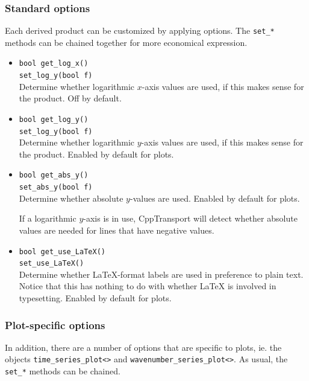\documentclass[11pt,a4paper]{article}
\newcommand{\packagefont}{\sffamily}
\newcommand{\CppTransport}{{\packagefont CppTransport}}
\begin{document}
\subsubsection{Standard options}
\label{sec:product-standard-options}
Each derived product can be customized by applying options.
The \texttt{set_*} methods can be chained together for more
economical expression.
\begin{itemize}
	\item \texttt{bool get_log_x()} \\
	\texttt{set_log_y(bool f)} \\
	Determine whether logarithmic $x$-axis values are used, if this makes sense
	for the product. Off by default.
	
	\item \texttt{bool get_log_y()} \\
	\texttt{set_log_y(bool f)} \\
	Determine whether logarithmic $y$-axis values are used, if this makes sense
	for the product. Enabled by default for plots.
	
	\item \texttt{bool get_abs_y()} \\
	\texttt{set_abs_y(bool f)} \\
	Determine whether absolute $y$-values are used. Enabled by default for plots.
	
	If a logarithmic $y$-axis is in use, {\CppTransport} will detect whether
	absolute values are needed for lines that have negative values.
	
	\item \texttt{bool get_use_LaTeX()} \\
	\texttt{set_use_LaTeX()} \\
	\label{method:use_LaTeX}
	Determine whether {\LaTeX}-format labels are used
	in preference to plain text.
	Notice that this has nothing to do with whether {\LaTeX}
	is involved in typesetting. Enabled by default for plots.
\end{itemize}

\subsubsection{Plot-specific options}
\label{sec:plot-options}
In addition, there are a number of options that are specific to plots,
ie. the objects
\texttt{time_series_plot<>}
and
\texttt{wavenumber_series_plot<>}.
As usual, the \texttt{set_*} methods can be chained.
\end{document}
